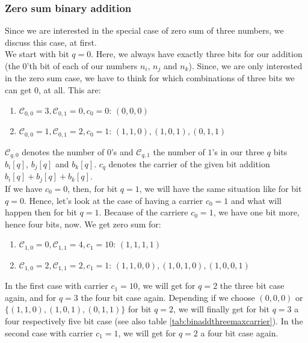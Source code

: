 \documentclass{article}
\newtheorem*{theorem A}{Theorem A}
\newtheorem*{theorem B}{N\"olker's Theorem}
\theoremstyle{remark}
\theoremstyle{remark}
\begin{document}
\subsubsection{Zero sum binary addition}
\label{sss:zerosumbinaryaddition}
Since we are interested in the special case of zero sum of three numbers, we discuss this case, at first.\\

We start with bit $q=0$. Here, we always have exactly three bits for our addition (the $0$'th bit of each of our numbers $n_{i}$, $n_{j}$ and $n_{k}$). Since, we are only interested in the zero sum case, we have to think for which combinations of three bits we can get $0$, at all. This are:

\begin{enumerate}
    \item $\mathcal{C}_{0,0} = 3, \mathcal{C}_{0,1} = 0, c_{0} = 0$: $\left(0,0,0\right)$
    \item $\mathcal{C}_{0,0} = 1, \mathcal{C}_{0,1} = 2, c_{0} = 1$: $\left(1,1,0\right), \left(1,0,1\right), \left(0,1,1\right)$
\label{enum:zerosum0thbit}
\end{enumerate}

$\mathcal{C}_{q,0}$ denotes the number of $0$'s and $\mathcal{C}_{q,1}$ the number of $1$'s in our three $q$ bits $b_{i}[q]$, $b_{j}[q]$ and $b_{k}[q]$. $c_{q}$ denotes the carrier of the given bit addition $b_{i}[q] + b_{j}[q] + b_{k}[q]$.\\

If we have $c_{0} = 0$, then, for bit $q = 1$, we will have the same situation like for bit $q = 0$. Hence, let's look at the case of having a carrier $c_{0} = 1$ and what will happen then for bit $q = 1$. Because of the carriere $c_{0} = 1$, we have one bit more, hence four bits, now. We get zero sum for:

\begin{enumerate}
    \item $\mathcal{C}_{1,0} = 0, \mathcal{C}_{1,1} = 4, c_{1} = 10$: $\left(1,1,1,1\right)$
    \item $\mathcal{C}_{1,0} = 2, \mathcal{C}_{1,1} = 2, c_{1} = 1$: $\left(1,1,0,0\right), \left(1,0,1,0\right), \left(1,0,0,1\right)$
\label{enum:zerosum1thbit}
\end{enumerate}

In the first case with carrier $c_{1} = 10$, we will get for $q = 2$ the three bit case again, and for $q = 3$ the four bit case again. Depending if we choose $\left(0,0,0\right)$ or $\{ \left(1,1,0\right), \left(1,0,1\right), \left(0,1,1\right) \}$ for bit $q = 2$, we will finally get for bit $q = 3$ a four respectively five bit case (see also table \ref{tab:binaddthreemaxcarrier}). In the second case with carrier $c_{1} = 1$, we will get for $q = 2$ a four bit case again.
\end{document}
